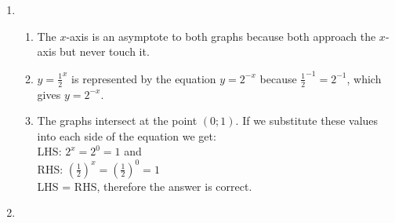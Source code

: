  \begin{solutions}{}{
 \begin{enumerate}[noitemsep, label=\textbf{\arabic*}. ] 
\item %
 \begin{enumerate}[noitemsep, label=\textbf{(\alph*)} ]
\item The $x$-axis is an asymptote to both graphs because both approach the $x$-axis but never touch it.%

\item $y= \frac{1}{2}^{x}$ is represented by the equation $y=2^{-x}$ because $\frac{1}{2}^{-1} = 2^{-1}$, which gives $y = 2^{-x}$. %
\item The graphs intersect at the point $(0;1)$. If we substitute these values into each side of the equation we get:\\
LHS: $ 2^{x}=2^0 = 1$ and\\
RHS: $\left(\frac{1}{2}\right)^x =\left(\frac{1}{2}\right)^0 = 1$\\
LHS = RHS, therefore the answer is correct.%
\end{enumerate}
\item %
\begin{enumerate}[noitemsep, label=\textbf{(\alph*)} ]


\end{enumerate}
\end{enumerate}}
\end{solutions}
